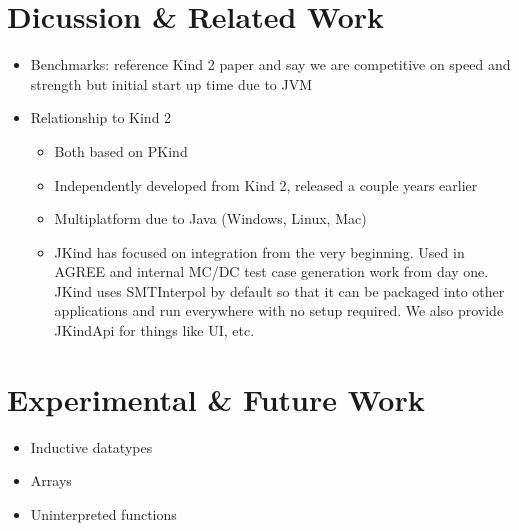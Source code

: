 \documentclass{article}
\begin{document}
\section{Dicussion \& Related Work}

\begin{itemize}
\item Benchmarks: reference Kind 2 paper and say we are competitive on
  speed and strength but initial start up time due to JVM
\item Relationship to Kind 2~\cite{champion2016cav}
  \begin{itemize}
  \item Both based on PKind
  \item Independently developed from Kind 2, released a couple years earlier
  \item Multiplatform due to Java (Windows, Linux, Mac)
  \item JKind has focused on integration from the very beginning. Used
    in AGREE and internal MC/DC test case generation work from day
    one. JKind uses SMTInterpol by default so that it can be packaged
    into other applications and run everywhere with no setup required.
    We also provide JKindApi for things like UI, etc.
  \end{itemize}
\end{itemize}

\section{Experimental \& Future Work}

\begin{itemize}
\item Inductive datatypes
\item Arrays
\item Uninterpreted functions
\end{itemize}

{}

\end{document}
